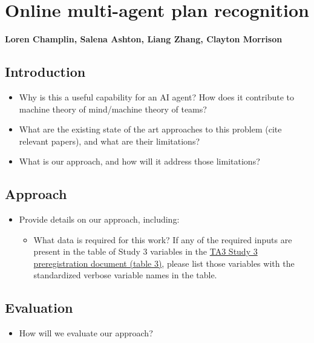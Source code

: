 \chapter{Online multi-agent plan recognition}
\textbf{Loren Champlin, Salena Ashton, Liang Zhang, Clayton Morrison}
\section{Introduction}
\begin{itemize}
    \item Why is this a useful capability for an AI agent? How does it
        contribute to machine theory of mind/machine theory of teams?
    \item What are the existing state of the art approaches to this problem
        (cite relevant papers), and what are their limitations? 
    \item What is our approach, and how will it address those limitations?
\end{itemize}

\section{Approach}
\begin{itemize}
    \item Provide details on our approach, including:
        \begin{itemize}
            \item What data is required for this work? If any of the required
                inputs are present in the table of Study 3 variables in the
                \href{https://docs.google.com/document/d/1GF7VsNF9R95IAaj6mVZUDV2mAX5ok1Bh6Tcm8zDpIkg/edit#heading=h.1ksv4uv}{TA3
                Study 3 preregistration document (table 3)}, please list those
                variables with the standardized verbose variable names in the table.
        \end{itemize}
\end{itemize}

\section{Evaluation}
\begin{itemize}
    \item How will we evaluate our approach?
\end{itemize}
